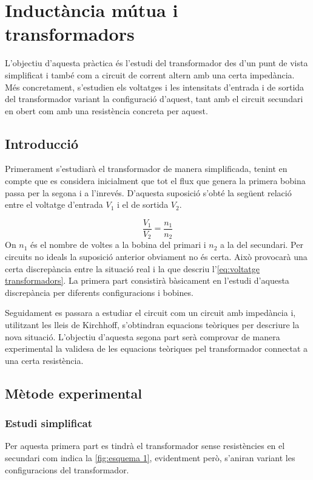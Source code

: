 \chapter{Inductància mútua i transformadors}

\begin{resum}
	L'objectiu d'aquesta pràctica és l'estudi del transformador des d'un punt de vista simplificat i també com a circuit de corrent altern amb una certa impedància. Més concretament, s'estudien els voltatges i les intensitats d'entrada i de sortida del transformador variant la configuració d'aquest, tant amb el circuit secundari en obert com amb una resistència concreta per aquest.
\end{resum}

\section{Introducció}\label{sec:introducció}

Primerament s'estudiarà el transformador de manera simplificada, tenint en compte que es considera inicialment que tot el flux que genera la primera bobina passa per la segona i a l'inrevés. D'aquesta suposició s'obté la següent relació entre el voltatge d'entrada $V_1$ i el de sortida $V_2$. 

\begin{equation}\label{eq:voltatge transformadors}
  \frac{V_1}{V_2}=\frac{n_1}{n_2}
\end{equation}
On $n_1$ és el nombre de voltes a la bobina del primari i $n_2$ a la del secundari. Per circuits no ideals la suposició anterior obviament no és certa. Això provocarà una certa discrepància entre la situació real i la que descriu l'\cref{eq:voltatge transformadors}. La primera part consistirà bàsicament en l'estudi d'aquesta discrepància per diferents configuracions i bobines.

Seguidament es passara a estudiar el circuit com un circuit amb impedància i, utilitzant les lleis de Kirchhoff, s'obtindran equacions teòriques per descriure la nova situació. L'objectiu d'aquesta segona part serà comprovar de manera experimental la validesa de les equacions teòriques pel transformador connectat a una certa resistència.

\section{Mètode experimental}\label{sec:met}
\subsection{Estudi simplificat}
Per aquesta primera part es tindrà el transformador sense resistències en el secundari com indica la \cref{fig:esquema 1}, evidentment però, s'aniran variant les configuracions del transformador.

